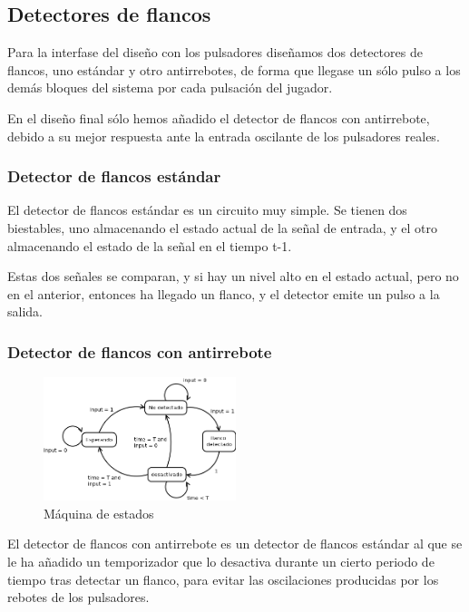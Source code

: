 \subsection{Detectores de flancos}
\label{edgeDetectors}

Para la interfase del diseño con los pulsadores diseñamos dos detectores de flancos, uno estándar y otro antirrebotes, de forma que llegase un sólo pulso a los demás bloques del sistema por cada pulsación del jugador.

En el diseño final sólo hemos añadido el detector de flancos con antirrebote, debido a su mejor respuesta ante la entrada oscilante de los pulsadores reales.

\subsubsection{Detector de flancos estándar}
\label{edgeDetectorStd}
El detector de flancos estándar es un circuito muy simple. Se tienen dos biestables, uno almacenando el estado actual de la señal de entrada, y el otro almacenando el estado de la señal en el tiempo t-1.

Estas dos señales se comparan, y si hay un nivel alto en el estado actual, pero no en el anterior, entonces ha llegado un flanco, y el detector emite un pulso a la salida.


\subsubsection{Detector de flancos con antirrebote}
\label{edgeDetectorDebounce}

\begin{figure}[H]
	\centering
	\includegraphics[width=0.5\textwidth]{edgeDetectorDebounceFSM.png}
	\caption{Máquina de estados}\label{fig:edgeDetectorDebounceFSM}
\end{figure}

El detector de flancos con antirrebote es un detector de flancos estándar al que se le ha añadido un temporizador que lo desactiva durante un cierto periodo de tiempo tras detectar un flanco, para evitar las oscilaciones producidas por los rebotes de los pulsadores.

